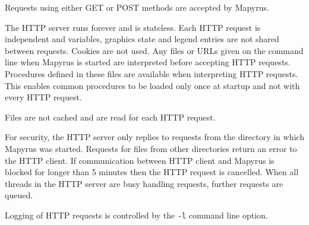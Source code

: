 Requests using either GET or POST methods are accepted by Mapyrus.

The HTTP server runs forever and
is stateless.  Each HTTP request is independent and
variables, graphics state and legend entries are not shared between
requests.  Cookies are not used.
Any files or URLs given on the command line when Mapyrus is started
are interpreted before accepting HTTP requests.
Procedures defined in these files
are available when interpreting HTTP requests.  This enables
common procedures to be loaded only once at startup and not with every
HTTP request.

Files are not cached and are read for each HTTP request.

For security, the HTTP server only replies to requests
from the directory in which Mapyrus was started.
Requests for files from other directories return an error to the HTTP client.
If communication between HTTP client and Mapyrus is blocked for longer than
5 minutes then the HTTP request is cancelled.
When all threads in the HTTP server are busy handling requests,
further requests are queued.

Logging of HTTP requests is controlled by the \texttt{-l} command line option.

